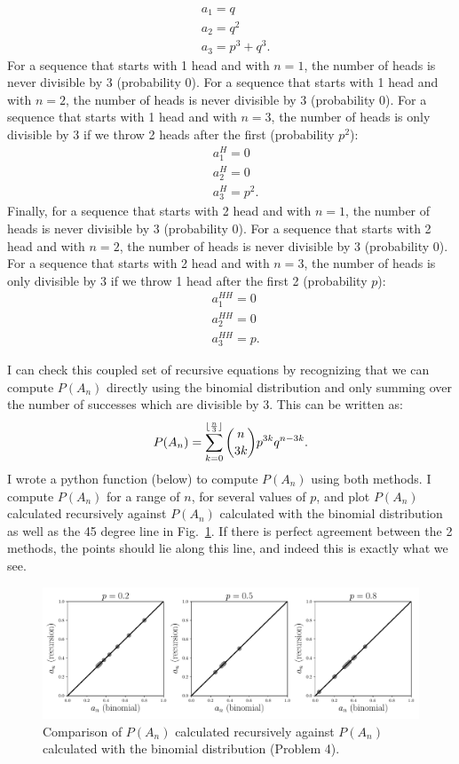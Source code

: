 \begin{problem}{4}
\begin{align*}
&a_1 = q\\
&a_2=q^2\\
&a_3=p^3+q^3.
\end{align*}
For a sequence that starts with 1 head and with $n=1$, the number of heads is never divisible by 3 (probability $0$).   For a sequence that starts with 1 head and with $n=2$, the number of heads is never divisible by 3 (probability $0$).  For a sequence that starts with 1 head and with $n=3$, the number of heads is only divisible by 3 if we throw 2 heads after the first (probability $p^2$):
\begin{align*}
&a_1^H = 0\\
&a_2^H=0\\
&a_3^H=p^2.
\end{align*}
Finally, for a sequence that starts with 2 head and with $n=1$, the number of heads is never divisible by 3 (probability $0$).   For a sequence that starts with 2 head and with $n=2$, the number of heads is never divisible by 3 (probability $0$).  For a sequence that starts with 2 head and with $n=3$, the number of heads is only divisible by 3 if we throw 1 head after the first 2 (probability $p$):
\begin{align*}
&a_1^{HH} = 0\\
&a_2^{HH}=0\\
&a_3^{HH}=p.
\end{align*}

I can check this coupled set of recursive equations by recognizing that we can compute $P(A_n)$ directly using the binomial distribution and only summing over the number of successes which are divisible by 3.  This can be written as:
\begin{equation*}
P(A_n) =\sum_{k=0}^{\lfloor\frac{n}{3}\rfloor }\binom{n}{3k} p^{3k}q^{n-3k}.
\end{equation*}
I wrote a python function (below) to compute $P(A_n)$ using both methods.  I compute $P(A_n)$ for a range of $n$, for several values of $p$, and plot $P(A_n)$ calculated recursively against  $P(A_n)$ calculated with the binomial distribution as well as the 45 degree line in Fig.~\ref{fig:prob_4}.  If there is perfect agreement between the 2 methods, the points should lie along this line, and indeed this is exactly what we see.

	\begin{figure}[t]
	\centering
      		 \includegraphics[totalheight=6cm]{chpt13/prob4.pdf}
  			  \caption{Comparison of $P(A_n)$ calculated recursively against $P(A_n)$ calculated with the binomial distribution (Problem 4).}
    			   \label{fig:prob_4}
	\end{figure}


\end{problem}
